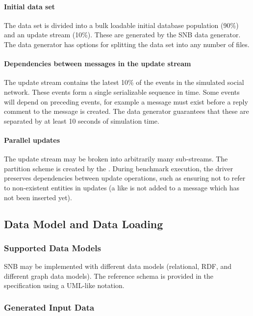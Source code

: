 \paragraph{Initial data set}
The data set is divided into a bulk loadable initial database population (90\%) and an update stream (10\%). These are generated by the SNB data generator. The data generator has options for splitting the data set into any number of files.

\paragraph{Dependencies between messages in the update stream}
The update stream contains the latest 10\% of the events in the simulated social network. These events form a single serializable sequence in time. Some events will depend on preceding events, for example a message must exist before a reply comment to the message is created. The data generator guarantees that these are separated by at least 10 seconds of simulation time.

\paragraph{Parallel updates}
The update stream may be broken into arbitrarily many sub-streams. The partition scheme is created by the \datagen. During benchmark execution, the driver preserves dependencies between update operations, such as ensuring not to refer to non-existent entities in updates (\eg a like is not added to a message which has not been inserted yet).

\subsection{Data Model and Data Loading}

\subsubsection{Supported Data Models}

SNB may be implemented with different data models (\eg relational, RDF, and different graph data models). The reference schema is provided in the specification using a UML-like notation. 


\subsubsection{Generated Input Data}
\label{sec:generated-data}

